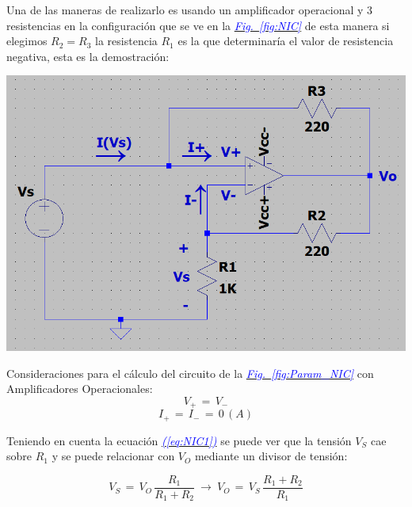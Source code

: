 \documentclass[12pt,a4paper]{report} %
\newcommand{\fref}[1]{\hyperref[#1]{\textcolor{blue}{\textit{Fig.~\ref*{#1}}}}}
\newcommand{\eref}[1]{\hyperref[#1]{\textcolor{blue}{\textit{(\ref*{#1})}}}}
\begin{document}
	\newpage
	
	Una de las maneras de realizarlo es usando un amplificador operacional y 3 resistencias en la configuración que se ve en la \fref{fig:NIC} de esta manera si elegimos $R_2=R_3$ la resistencia $R_1$ es la que determinaría el valor de resistencia negativa, esta es la demostración:
	
	\begin{center}
	\begin{multicols}{2}
		\centering
		\includegraphics[width=\columnwidth]{demotracion_NIC.png}
		\label{fig:Param_NIC}
	
		\columnbreak
		
		Consideraciones para el cálculo del circuito de la \fref{fig:Param_NIC} con Amplificadores Operacionales:\\
		\begin{equation}
			V_+\,=\,V_-
			\label{eq:NIC1}
		\end{equation}
		\begin{equation}
			I_+\,=\,I_-\,=\,0\,(A)
			\label{eq:NIC2}
		\end{equation}
	\end{multicols}
	\end{center}
	
	Teniendo en cuenta la ecuación \eref{eq:NIC1} se puede ver que la tensión $V_S$ cae sobre $R_1$ y se puede relacionar con $V_O$ mediante un divisor de tensión:
	
	\begin{equation}
		V_S\,=\,V_O\,\frac{R_1}{R_1 + R_2}\:\longrightarrow\:V_O\,=\,V_S\,\frac{R_1 + R_2}{R_1}
		\label{eq:NIC3}
	\end{equation}\smallskip
	
\end{document}
